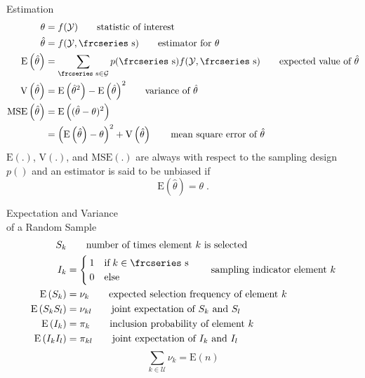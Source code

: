 \documentclass[10pt]{beamer}\usepackage[]{graphicx}\usepackage[]{color}
\newcommand{\eqname}[1]{\tag*{#1}} %
\newcommand{\textfrc}[1]{{\frcseries#1}}
\newcommand{\mathfrc}[1]{\text{\textfrc{#1}}}
\newcommand{\E}[1]{\text{E}\left(#1\right)}
\newcommand{\V}[1]{\text{V}\left(#1\right)}
\newcommand{\MSE}[1]{\text{MSE}\left(#1\right)}
\begin{document}
\begin{frame}{Estimation}
\begin{align}
 \theta       & = f(\mathcal{Y})  \eqname{statistic of interest} \\
 \hat{\theta} & = f(\mathcal{Y}, \mathfrc{s} )  \eqname{estimator for $\theta$} \\
 \E{\hat{\theta}} & = \sum_{\mathfrc{s} \in \mathcal{G}} p(\mathfrc{s}) f(\mathcal{Y}, \mathfrc{s} )   \eqname{expected value of $\hat{\theta}$} \\
 \V{\hat{\theta}}   & =  \E{\hat{\theta}^2} -  {\E{\hat{\theta}}}^2 \eqname{variance of  $\hat{\theta}$} \\
 \MSE{\hat{\theta}} & = \E{(\hat{\theta} - \theta)^2} \nonumber \\
                    & = \left(\E{\hat{\theta}} - \theta\right)^2 + \V{\hat{\theta}} \eqname{mean square error of $\hat{\theta}$}
\end{align}
 $\E{.}$, $\V{.}$, and $\MSE{.}$ are always with respect to the sampling design $p()$ and
 an estimator is said to be unbiased if
 $$ \E{\hat{\theta}} = \theta\;. $$
\end{frame}


% 
% 

\begin{frame}{Expectation and Variance \\ of a Random Sample}
\begin{align}
 S_k   &    \eqname{number of times element $k$ is selected} \\
 I_k   &=   \begin{cases}   1  & \text{if}\; k \in \mathfrc{s} \\
                            0  & \text{else}  
          \end{cases}   \eqname{sampling indicator element $k$} \\
\E{S_k}     &  =  \nu_k    \eqname{expected selection frequency of element $k$} \\
\E{S_k S_l} &  =  \nu_{kl} \eqname{joint expectation  of $S_k$ and $S_l$} \\
\E{I_k}     &  =   \pi_k    \eqname{inclusion probability of element $k$ } \\
\E{I_k I_l} &  =   \pi_{kl}  \eqname{joint expectation of $I_k$ and $I_l$} 
\end{align}
\begin{equation}
\sum_{k \in \mathcal{U}}\nu_k = \E{n} \eqname{expected sample size}
\end{equation}
\end{frame}
\end{document}
